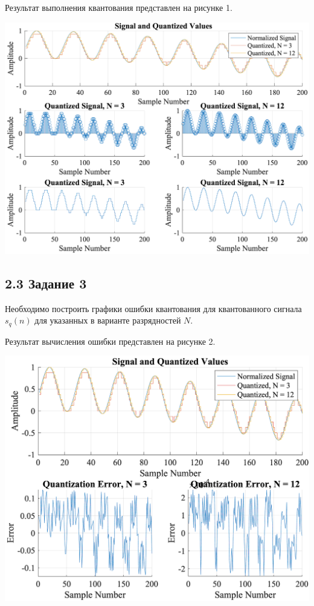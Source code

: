 \documentclass[a4paper,14pt]{extarticle}
\begin{document}
  Результат выполнения квантования представлен 
на рисунке 1.
\begin{center}
  \includegraphics{img/Task_2.png}
\end{center}

\subsection*{2.3 Задание 3}
Необходимо построить графики ошибки квантования для квантованного сигнала
$s_q(n)$ для указанных в варианте разрядностей $N$. 



  Результат вычисления ошибки представлен 
на рисунке 2.
\begin{center}
  \includegraphics{img/Task_3.png}
\end{center}
\end{document}
